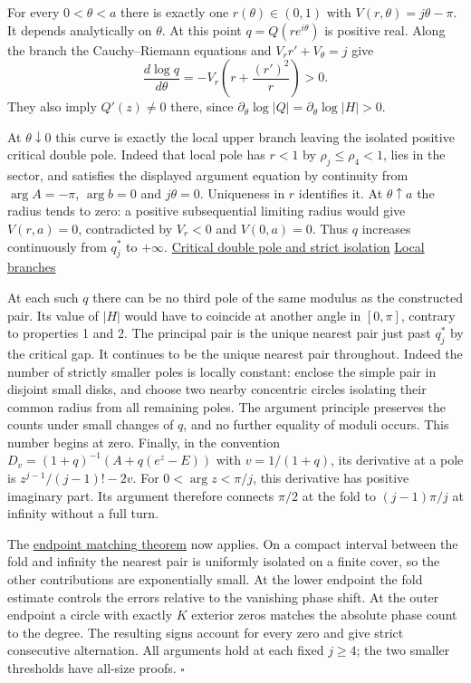 \documentclass[11pt]{article}
\begin{document}
For every $0<\theta<a$ there is exactly one $r(\theta)\in(0,1)$ with $V(r,\theta)=j\theta-\pi$. It depends analytically on $\theta$. At this point $q=Q(re^{i\theta})$ is positive real. Along the branch the Cauchy--Riemann equations and $V_r r'+V_\theta=j$ give
\[
\frac{d\log q}{d\theta}
 =-V_r\left(r+\frac{(r')^2}{r}\right)>0 .
\]
They also imply $Q'(z)\ne0$ there, since $\partial_\theta\log|Q|=\partial_\theta\log|H|>0$.

At $\theta\downarrow0$ this curve is exactly the local upper branch leaving the isolated positive critical double pole. Indeed that local pole has $r<1$ by $\rho_j\le\rho_4<1$, lies in the sector, and satisfies the displayed argument equation by continuity from $\arg A=-\pi$, $\arg b=0$ and $j\theta=0$. Uniqueness in $r$ identifies it. At $\theta\uparrow a$ the radius tends to zero: a positive subsequential limiting radius would give $V(r,a)=0$, contradicted by $V_r<0$ and $V(0,a)=0$. Thus $q$ increases continuously from $q_j^*$ to $+\infty$. \href{https://github.com/ProgramComputer/open-math-research/blob/main/topics/ordered-large-blocks/lower-spectral-edge.md}{Critical double pole and strict isolation} \enspace \href{https://github.com/ProgramComputer/open-math-research/blob/main/topics/ordered-large-blocks/fixed-threshold-inner-zeros.md}{Local branches}

At each such $q$ there can be no third pole of the same modulus as the constructed pair. Its value of $|H|$ would have to coincide at another angle in $[0,\pi]$, contrary to properties 1 and 2. The principal pair is the unique nearest pair just past $q_j^*$ by the critical gap. It continues to be the unique nearest pair throughout. Indeed the number of strictly smaller poles is locally constant: enclose the simple pair in disjoint small disks, and choose two nearby concentric circles isolating their common radius from all remaining poles. The argument principle preserves the counts under small changes of $q$, and no further equality of moduli occurs. This number begins at zero. Finally, in the convention $D_v=(1+q)^{-1}(A+q(e^z-E))$ with $v=1/(1+q)$, its derivative at a pole is $z^{j-1}/(j-1)!-2v$. For $0<\arg z<\pi/j$, this derivative has positive imaginary part. Its argument therefore connects $\pi/2$ at the fold to $(j-1)\pi/j$ at infinity without a full turn.

The \href{https://github.com/ProgramComputer/open-math-research/blob/main/topics/ordered-large-blocks/fixed-threshold-outer-interface.md}{endpoint matching theorem} now applies. On a compact interval between the fold and infinity the nearest pair is uniformly isolated on a finite cover, so the other contributions are exponentially small. At the lower endpoint the fold estimate controls the errors relative to the vanishing phase shift. At the outer endpoint a circle with exactly $K$ exterior zeros matches the absolute phase count to the degree. The resulting signs account for every zero and give strict consecutive alternation. All arguments hold at each fixed $j\ge4$; the two smaller thresholds have all-size proofs. $\square$
\end{document}
